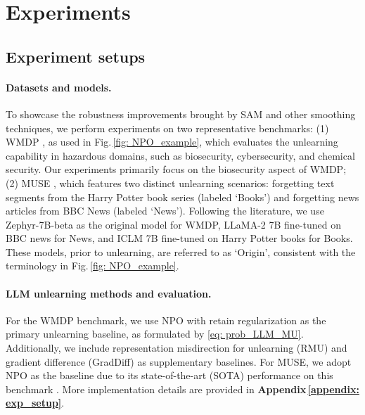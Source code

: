 

\section{Experiments}
\label{sec: exp}
\subsection{Experiment setups}

\paragraph{Datasets and models.}To showcase the robustness improvements brought by SAM and other smoothing techniques, we perform experiments on two representative benchmarks:
 {(1) WMDP} \citep{li2024wmdp}, as used in Fig.\,\ref{fig: NPO_example}, which evaluates the unlearning capability in hazardous domains, such as biosecurity, cybersecurity, and chemical security. Our experiments primarily focus on the biosecurity aspect of WMDP; 
 {(2) MUSE} \citep{shi2024muse}, which features two distinct unlearning scenarios: forgetting text segments from the Harry Potter book series (labeled `Books') and forgetting news articles from BBC News (labeled `News'). Following the literature, we use Zephyr-7B-beta as the original model for WMDP, LLaMA-2 7B fine-tuned on BBC news for News, and ICLM 7B fine-tuned on Harry Potter books for Books. These models, prior to unlearning, are referred to as `Origin', consistent with the terminology in Fig.\,\ref{fig: NPO_example}.


 
  

\paragraph{LLM unlearning methods and evaluation.} For the WMDP benchmark, we use NPO \citep{zhang2024negative} with retain regularization as the primary unlearning baseline, as formulated by  \eqref{eq: prob_LLM_MU}. Additionally, we include representation misdirection for unlearning (RMU) \citep{li2024wmdp} and gradient difference (GradDiff) \citep{maini2024tofu,liu2022continual} as supplementary baselines. For   MUSE, we adopt NPO as the baseline due to its state-of-the-art (SOTA) performance on this benchmark \citep{shi2024muse}. More implementation details are provided in \textbf{Appendix\,\ref{appendix: exp_setup}}.

